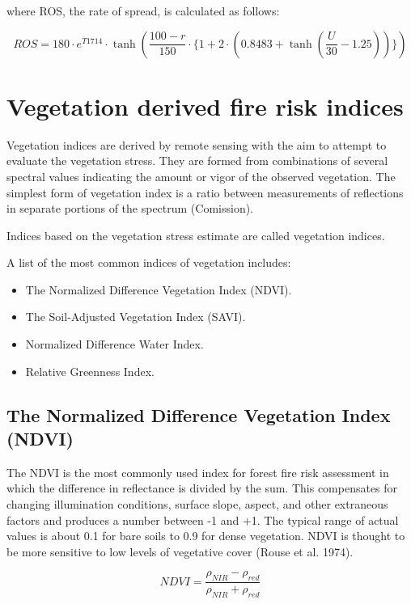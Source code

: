 {{	where ROS, the rate of spread, is calculated as follows:
	
	\begin{equation}
	ROS =  180 \cdot e^{T 1714} \cdot  \tanh(\frac{100 - r}{150} \cdot \{1 + 2 \cdot  (0.8483 + \tanh(\frac{U}{30} - 1.25))\})
	\end{equation}

\section{Vegetation derived fire risk indices}
	Vegetation indices are derived by remote sensing with the aim to attempt to evaluate the vegetation
	stress. They are formed from combinations of several spectral values indicating the amount or vigor of the observed vegetation. The simplest form of vegetation index is a ratio between measurements of reflections in separate portions of the spectrum (Comission).
	
	Indices based on the vegetation stress estimate are called vegetation indices.
	
	A list of the most common indices of vegetation includes: 
	
	\begin{itemize}
		\item The Normalized Difference Vegetation Index (NDVI).
		\item The Soil-Adjusted Vegetation Index (SAVI).
		\item Normalized Difference Water Index.
		\item Relative Greenness Index.
	\end{itemize}

\subsection{The Normalized Difference Vegetation Index (NDVI)}
	The NDVI is the most commonly used index for forest fire risk assessment in which the difference in reflectance is divided by the sum. This compensates for changing illumination conditions, surface slope, aspect, and other extraneous factors and produces a number between -1 and +1. The typical range of actual values is about 0.1 for bare soils to 0.9 for dense vegetation. NDVI is thought to be more sensitive to low levels of vegetative cover (Rouse et al. 1974).
	
	\begin{equation}
	NDVI = \dfrac{\rho_{NIR} - \rho_{red}}{\rho_{NIR} + \rho_{red}}
	\end{equation}
	
}}

